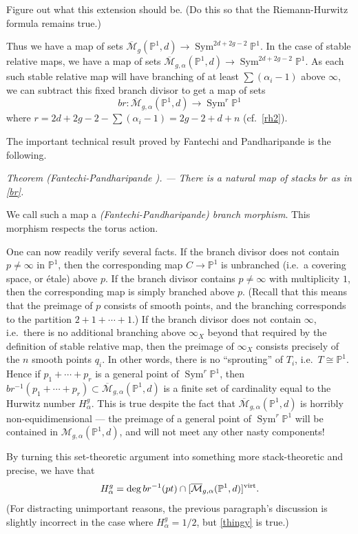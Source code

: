 \documentclass[12pt,letterpaper]{amsart}
\newcommand{\tpoint}[1]{\vspace{3mm}\par \noindent \refstepcounter{subsection}{\bf \thesubsection.} 
  {\em #1. ---} }
\newcommand{\proj}{\mathbb P}
\newcommand{\cm}{{\mathcal{M}}}
\newcommand{\cmbar}{\overline{\cm}}
\newcommand{\al}{\alpha}
\newcommand{\Sym}{\operatorname{Sym}}
\newcommand{\virt}{\rm{virt}}
\newcommand{\lremind}[1]{{\bf[label:  #1]}}
\renewcommand{\lremind}[1]{{}}
\begin{document}
{  Figure out what this extension should be.
(Do this so that the Riemann-Hurwitz formula remains true.)

Thus we have a map of sets $\cmbar_g(\proj^1,d) \rightarrow
\Sym^{2d+2g-2} \proj^1$.  In the case of stable relative maps, we have
a map of sets $\cmbar_{g,\al}(\proj^1,d) \rightarrow \Sym^{2d+2g-2}
\proj^1$.  As each  such stable relative map will have 
branching of at least $\sum(\al_i-1)$ above $\infty$, we can subtract
this fixed branch divisor to get a map of sets\lremind{br}
\begin{equation}
\label{br}
br: \cmbar_{g,\al}(\proj^1,d) \rightarrow \Sym^r \proj^1
\end{equation}
where $r = 2d+2g-2 - \sum(\al_i-1) = 2g-2+d+n$
(cf.\ \eqref{rh2}).

The important technical result proved by Fantechi and Pandharipande
is the following.

\tpoint{Theorem (Fantechi-Pandharipande \cite{fp})}
{\em There is a natural map of stacks $br$ as in \eqref{br}.}

We call such a map a {\em (Fantechi-Pandharipande) branch morphism}.
This morphism respects the torus action.

One can now readily verify several facts.  If the branch divisor does
not contain $p \neq \infty$ in $\proj^1$, then the corresponding map
$C \rightarrow \proj^1$ is unbranched (i.e.\ a covering space, or
\'etale) above $p$.  If the branch divisor contains $p \neq \infty$
with multiplicity $1$, then the corresponding map is simply branched
above $p$. (Recall that this means that the preimage of $p$
consists of smooth points, and the branching corresponds to the partition
$2+1+\cdots+1$.)
If the branch divisor does not contain $\infty$, i.e.\ there is no
additional branching above $\infty_X$ beyond that required by the definition of
stable relative map, then the preimage of $\infty_X$ consists
precisely of the $n$ smooth points $q_i$.  In other words, there is no
``sprouting'' of $T_i$, i.e.\ $T \cong \proj^1$. Hence
if $p_1 + \cdots + p_r$ is a general point of $\Sym^r \proj^1$, then
$br^{-1}(p_1 + \cdots + p_r) \subset  \cmbar_{g, \al}(\proj^1, d)$ 
is a finite set of cardinality equal to  the Hurwitz number $H^g_{\al}$.
This is true despite the fact that $\cmbar_{g,\al}(\proj^1, d)$
is horribly non-equidimensional --- the preimage of a general
point of $\Sym^r \proj^1$ will be contained in $\cm_{g,\al}(\proj^1,d)$, and
will not meet any other nasty components!

By turning this set-theoretic argument into something
more stack-theoretic and precise, we have that \lremind{thingy}
\begin{equation}
\label{thingy}
H^g_{\al} = \deg br^{-1}( pt ) \cap [\cmbar_{g,\al}(\proj^1, d)]^{\virt}.
\end{equation}  (For distracting
unimportant reasons, the previous paragraph's discussion is slightly
incorrect in the case where $H^g_{\al} = 1/2$, but \eqref{thingy}
is true.)

}
\end{document}
